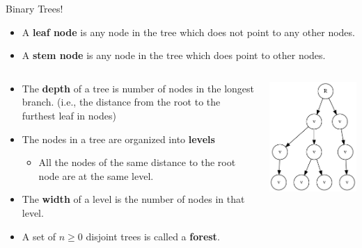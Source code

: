 \documentclass[11pt]{beamer}
\begin{document}
\begin{frame}{Binary Trees!}
\begin{itemize}
\item A \textbf{leaf node} is any node in the tree which does not point to any other nodes.
\item A \textbf{stem node} is any node in the tree which does point to other nodes.
\end{itemize}
\begin{columns}
\begin{column}{0.75\textwidth}
\begin{itemize}  
\item The \textbf{depth} of a tree is number of nodes in the longest branch.  (i.e., the distance from the root to the furthest leaf in nodes)
\item The nodes in a tree are organized into \textbf{levels}
\begin{itemize}
\item All the nodes of the same distance to the root node are at the same level.  
\end{itemize}
\item The \textbf{width} of a level is the number of nodes in that level.
\item A set of $n \geq 0$ disjoint trees is called a \textbf{forest}.
\end{itemize}
\end{column}
\begin{column}{0.25\textwidth}
\center
\includegraphics[scale=0.3]{graphs/tree.png}
\end{column}
\end{columns}
\end{frame}
\end{document}
